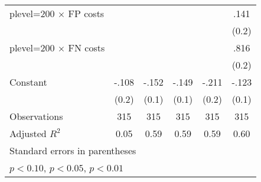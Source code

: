 \begin{table}[H]
\begin{tabular}{l*{5}{c}}
plevel=200 $\times$ FP costs&                  &                  &                  &                  &     .141         \\
                &                  &                  &                  &                  &    (0.2)         \\
plevel=200 $\times$ FN costs&                  &                  &                  &                  &     .816\sym{***}\\
                &                  &                  &                  &                  &    (0.2)         \\
Constant        &    -.108         &    -.152\sym{*}  &    -.149\sym{*}  &    -.211         &    -.123         \\
                &    (0.2)         &    (0.1)         &    (0.1)         &    (0.2)         &    (0.1)         \\
\hline
Observations    &      315         &      315         &      315         &      315         &      315         \\
Adjusted \(R^{2}\)&     0.05         &     0.59         &     0.59         &     0.59         &     0.60         \\
\hline\hline
\multicolumn{6}{l}{\footnotesize Standard errors in parentheses}\\
\multicolumn{6}{l}{\footnotesize \sym{*} \(p<0.10\), \sym{**} \(p<0.05\), \sym{***} \(p<0.01\)}\\
\end{tabular}
\end{table}

